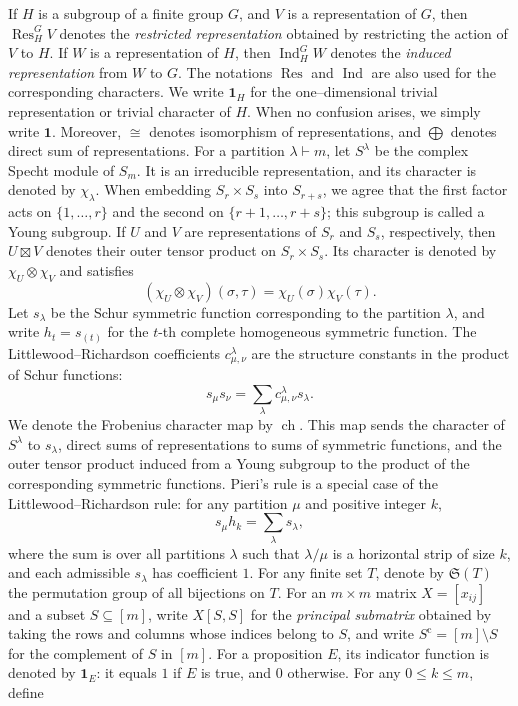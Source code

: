 \documentclass[11pt,a4paper]{article}
\begin{document}
If $H$ is a subgroup of a finite group $G$, and $V$ is a representation of $G$, then $\operatorname{Res}_H^G V$ denotes the {\em restricted representation} obtained by restricting the action of $V$ to $H$. If $W$ is a representation of $H$, then $\operatorname{Ind}_H^G W$ denotes the {\em induced representation} from $W$ to $G$. The notations $\operatorname{Res}$ and $\operatorname{Ind}$ are also used for the corresponding characters. We write $\mathbf{1}_H$ for the one–dimensional trivial representation or trivial character of $H$. When no confusion arises, we simply write $\mathbf{1}$. Moreover, $\cong$ denotes isomorphism of representations, and $\bigoplus$ denotes direct sum of representations.
For a partition $\lambda\vdash m$, let $S^\lambda$ be the complex Specht module of $S_m$. It is an irreducible representation, and its character is denoted by $\chi_\lambda$. When embedding $S_r\times S_s$ into $S_{r+s}$, we agree that the first factor acts on $\{1,\ldots,r\}$ and the second on $\{r+1,\ldots,r+s\}$; this subgroup is called a Young subgroup. If $U$ and $V$ are representations of $S_r$ and $S_s$, respectively, then $U\boxtimes V$ denotes their outer tensor product on $S_r\times S_s$. Its character is denoted by $\chi_U\otimes\chi_V$ and satisfies
\[
  (\chi_U\otimes\chi_V)(\sigma,\tau)
  =\chi_U(\sigma)\chi_V(\tau).
\]
Let $s_\lambda$ be the Schur symmetric function corresponding to the partition $\lambda$, and write $h_t=s_{(t)}$ for the $t$-th complete homogeneous symmetric function. The Littlewood–Richardson coefficients $c_{\mu,\nu}^{\lambda}$ are the structure constants in the product of Schur functions:
\[
  s_\mu s_\nu=\sum_\lambda c_{\mu,\nu}^{\lambda}s_\lambda.
\]
We denote the Frobenius character map by $\operatorname{ch}$. This map sends the character of $S^\lambda$ to $s_\lambda$, direct sums of representations to sums of symmetric functions, and the outer tensor product induced from a Young subgroup to the product of the corresponding symmetric functions. Pieri's rule is a special case of the Littlewood–Richardson rule: for any partition $\mu$ and positive integer $k$,
\[
  s_\mu h_k=\sum_\lambda s_\lambda,
\]
where the sum is over all partitions $\lambda$ such that $\lambda/\mu$ is a horizontal strip of size $k$, and each admissible $s_\lambda$ has coefficient $1$.
For any finite set $T$, denote by $\mathfrak S(T)$ the permutation group of all bijections on $T$. For an $m\times m$ matrix $X=[x_{ij}]$ and a subset $S\subseteq[m]$, write $X[S,S]$ for the {\em principal submatrix} obtained by taking the rows and columns whose indices belong to $S$, and write $S^{\mathrm{c}}=[m]\setminus S$ for the complement of $S$ in $[m]$. For a proposition $E$, its indicator function is denoted by $\mathbf{1}_E$: it equals $1$ if $E$ is true, and $0$ otherwise. For any $0\leq k\leq m$, define
\end{document}
